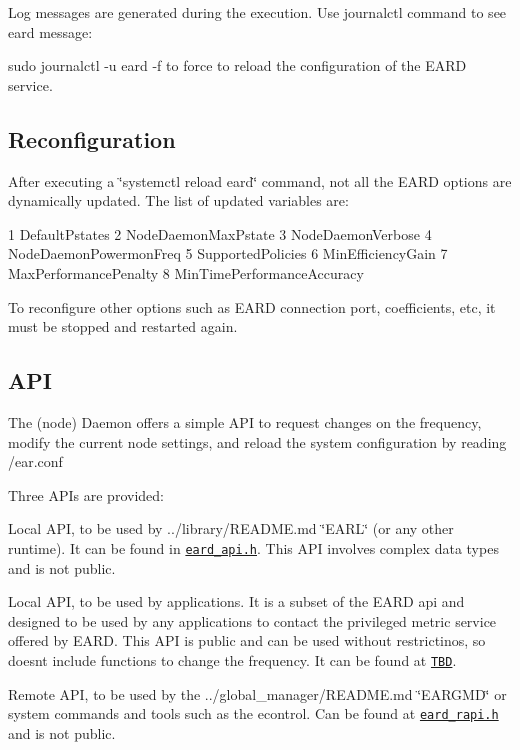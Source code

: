 Log messages are generated during the execution. Use journalctl command to see eard message\+:


\begin{DoxyItemize}
\item {\ttfamily sudo journalctl -\/u eard -\/f} to force to reload the configuration of the E\+A\+RD service.
\end{DoxyItemize}

\subsection*{Reconfiguration }

After executing a \char`\"{}systemctl reload eard\char`\"{} command, not all the E\+A\+RD options are dynamically updated. The list of updated variables are\+:


\begin{DoxyCode}
1 DefaultPstates
2 NodeDaemonMaxPstate
3 NodeDaemonVerbose
4 NodeDaemonPowermonFreq
5 SupportedPolicies
6 MinEfficiencyGain
7 MaxPerformancePenalty
8 MinTimePerformanceAccuracy
\end{DoxyCode}


To reconfigure other options such as E\+A\+RD connection port, coefficients, etc, it must be stopped and restarted again.

\subsection*{A\+PI }

The (node) Daemon offers a simple A\+PI to request changes on the frequency, modify the current node settings, and reload the system configuration by reading {\ttfamily /ear.conf}

Three A\+P\+Is are provided\+:
\begin{DoxyItemize}
\item Local A\+PI, to be used by ../library/\+R\+E\+A\+D\+ME.md \char`\"{}\+E\+A\+R\+L\char`\"{} (or any other runtime). It can be found in \href{eard_api.h}{\tt eard\+\_\+api.\+h}. This A\+PI involves complex data types and is not public.
\item Local A\+PI, to be used by applications. It is a subset of the E\+A\+RD api and designed to be used by any applications to contact the privileged metric service offered by E\+A\+RD. This A\+PI is public and can be used without restrictinos, so doesn\textquotesingle{}t include functions to change the frequency. It can be found at \href{.}{\tt T\+BD}.
\item Remote A\+PI, to be used by the ../global\+\_\+manager/\+R\+E\+A\+D\+ME.md \char`\"{}\+E\+A\+R\+G\+M\+D\char`\"{} or system commands and tools such as the {\ttfamily econtrol}. Can be found at \href{eard_rapi.h}{\tt eard\+\_\+rapi.\+h} and is not public.
\end{DoxyItemize}

